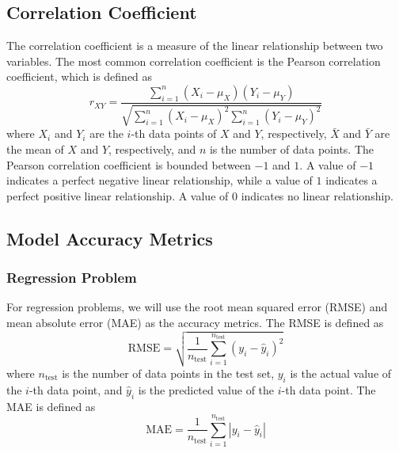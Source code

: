 \documentclass[conf]{new-aiaa}
\begin{document}
\subsection{Correlation Coefficient}
The correlation coefficient is a measure of the linear relationship between two variables. The most common correlation coefficient is the Pearson correlation coefficient, which is defined as
\begin{equation} \label{eq:pearsoncorr}
    r_{XY} = \frac{\sum_{i=1}^n \left(X_i - \mu_{X}\right)\left(Y_i - \mu_{Y}\right)}{\sqrt{\sum_{i=1}^n \left(X_i - \mu_{X}\right)^2 \sum_{i=1}^n \left(Y_i - \mu_{Y}\right)^2}}
\end{equation}
where $X_i$ and $Y_i$ are the $i$-th data points of $X$ and $Y$, respectively, $\bar{X}$ and $\bar{Y}$ are the mean of $X$ and $Y$, respectively, and $n$ is the number of data points. The Pearson correlation coefficient is bounded between $-1$ and $1$. A value of $-1$ indicates a perfect negative linear relationship, while a value of $1$ indicates a perfect positive linear relationship. A value of $0$ indicates no linear relationship.

\subsection{Model Accuracy Metrics}
\subsubsection{Regression Problem}
For regression problems, we will use the root mean squared error (RMSE) and mean absolute error (MAE) as the accuracy metrics. The RMSE is defined as
\begin{equation} \label{eq:rmse}
    \textrm{RMSE} = \sqrt{\frac{1}{n_\textrm{test}} \sum_{i=1}^{n_\textrm{test}} \left(y_i - \hat{y}_i\right)^2}
\end{equation}
where $n_\textrm{test}$ is the number of data points in the test set, $y_i$ is the actual value of the $i$-th data point, and $\hat{y}_i$ is the predicted value of the $i$-th data point. The MAE is defined as
\begin{equation} \label{eq:mae}
    \textrm{MAE} = \frac{1}{n_\textrm{test}} \sum_{i=1}^{n_\textrm{test}} \left|y_i - \hat{y}_i\right|
\end{equation}
\end{document}
